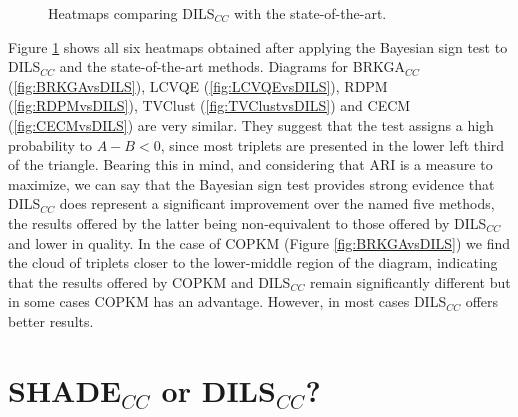 \begin{figure}[bth]
	\myfloatalign
	 \quad
	 \quad
	\caption{Heatmaps comparing \acs{DILS}$_{CC}$ with the state-of-the-art.}
	\label{fig:HeatmapsDILSvsSOTA}
\end{figure}

Figure \ref{fig:HeatmapsDILSvsSOTA} shows all six heatmaps obtained after applying the Bayesian sign test to \acs{DILS}$_{CC}$ and the state-of-the-art methods. Diagrams for \acs{BRKGA}$_{CC}$ (\ref{fig:BRKGAvsDILS}), \acs{LCVQE} (\ref{fig:LCVQEvsDILS}), \acs{RDPM} (\ref{fig:RDPMvsDILS}), \acs{TVClust} (\ref{fig:TVClustvsDILS}) and \acs{CECM} (\ref{fig:CECMvsDILS}) are very similar. They suggest that the test assigns a high probability to $A - B < 0$, since most triplets are presented in the lower left third of the triangle. Bearing this in mind, and considering that \acs{ARI} is a measure to maximize, we can say that the Bayesian sign test provides strong evidence that \acs{DILS}$_{CC}$ does represent a significant improvement over the named five methods, the results offered by the latter being non-equivalent to those offered by \acs{DILS}$_{CC}$ and lower in quality. In the case of \acs{COPKM} (Figure \ref{fig:BRKGAvsDILS}) we find the cloud of triplets closer to the lower-middle region of the diagram, indicating that the results offered by \acs{COPKM} and \acs{DILS}$_{CC}$ remain significantly different but in some cases \acs{COPKM} has an advantage. However, in most cases \acs{DILS}$_{CC}$ offers better results.

\section[\acsfont{SHADE}$_{CC}$ or \acsfont{DILS}$_{CC}$?]{SHADE$_{CC}$ or DILS$_{CC}$?} \label{sec:SHADEorDILS}

